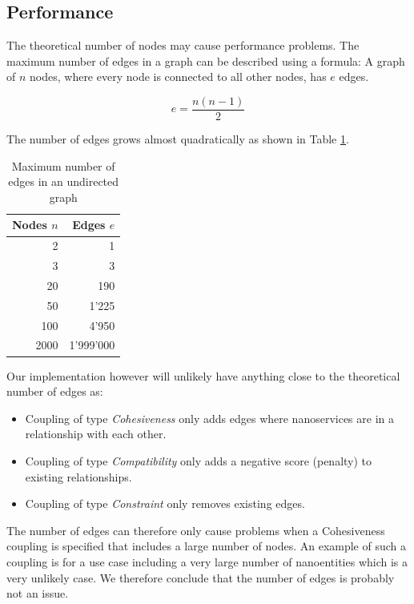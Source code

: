\subsection{Performance}


The theoretical number of nodes may cause performance problems. The maximum number of edges in a graph can be described using a formula: A graph of $n$ nodes, where every node is connected to all other nodes, has $e$ edges.

\begin{displaymath}
e = \frac{n(n-1)}{2}
\end{displaymath}

The number of edges grows almost quadratically as shown in Table \ref{tab:edgesCount}.

\begin{table}[H]
	\centering
	\caption{Maximum number of edges in an undirected graph}
	\label{tab:edgesCount}
	\begin{tabular}{|r|r|}
		\hline \textbf{Nodes} $n$ & \textbf{Edges} $e$ \\ 
		\hline 2 & 1 \\ 
		\hline 3 & 3 \\ 
		\hline 20 & 190 \\ 
		\hline 50 & 1'225 \\ 
		\hline 100 & 4'950 \\ 
		\hline 2000 & 1'999'000 \\ 
		\hline 
	\end{tabular} 
\end{table}

Our implementation however will unlikely have anything close to the theoretical number of edges as:
\begin{itemize}
	\item Coupling of type \textit{Cohesiveness} only adds edges where nanoservices are in a relationship with each other.
	\item Coupling of type \textit{Compatibility} only adds a negative score (penalty) to existing relationships.
	\item Coupling of type \textit{Constraint} only removes existing edges.
\end{itemize}

The number of edges can therefore only cause problems when a Cohesiveness coupling is specified that includes a large number of nodes. An example of such a coupling is for a use case including a very large number of nanoentities which is a very unlikely case. We therefore conclude that the number of edges is probably not an issue.



